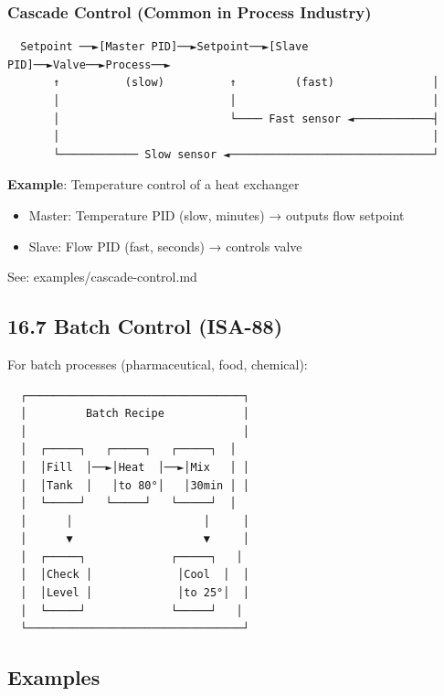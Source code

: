 \documentclass[11pt,a4paper]{book}
\begin{document}
\begin{itemize}
\subsubsection{Cascade Control (Common in Process Industry)}

\begin{lstlisting}
  Setpoint ──►[Master PID]──►Setpoint──►[Slave PID]──►Valve──►Process──►
       ↑          (slow)          ↑         (fast)               │
       │                          │                              │
       │                          └──── Fast sensor ◄────────────┤
       │                                                         │
       └──────────── Slow sensor ◄───────────────────────────────┘
\end{lstlisting}

\textbf{Example}: Temperature control of a heat exchanger
\begin{itemize}
\item Master: Temperature PID (slow, minutes) → outputs flow setpoint
\item Slave: Flow PID (fast, seconds) → controls valve
\end{itemize}

See: examples/cascade-control.md

\medskip\noindent\hrulefill\medskip

\subsection{16.7 Batch Control (ISA-88)}

For batch processes (pharmaceutical, food, chemical):

\begin{lstlisting}
  ┌─────────────────────────────────┐
  │         Batch Recipe            │
  │                                 │
  │  ┌─────┐   ┌─────┐   ┌─────┐  │
  │  │Fill  │──►│Heat  │──►│Mix   │ │
  │  │Tank  │   │to 80°│   │30min │ │
  │  └─────┘   └─────┘   └─────┘  │
  │      │                    │     │
  │      ▼                    ▼     │
  │  ┌─────┐             ┌─────┐   │
  │  │Check │             │Cool  │  │
  │  │Level │             │to 25°│  │
  │  └─────┘             └─────┘   │
  └─────────────────────────────────┘
\end{lstlisting}

\medskip\noindent\hrulefill\medskip

\subsection{Examples}


\end{itemize}
\end{document}
